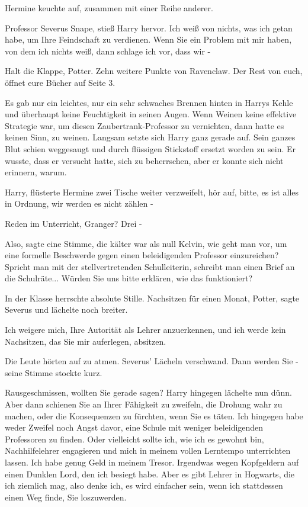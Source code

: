 Hermine keuchte auf, zusammen mit einer Reihe anderer.

\glqq Professor Severus Snape\grqq{}, stieß Harry hervor. \glqq Ich weiß von
nichts, was ich getan habe, um Ihre Feindschaft zu verdienen. Wenn Sie ein
Problem mit mir haben, von dem ich nichts weiß, dann schlage ich vor, dass wir
-\grqq{}

\glqq Halt die Klappe, Potter. Zehn weitere Punkte von Ravenclaw. Der Rest von
euch, öffnet eure Bücher auf Seite 3.\grqq{}

Es gab nur ein leichtes, nur ein sehr schwaches Brennen hinten in Harrys Kehle
und überhaupt keine Feuchtigkeit in seinen Augen. Wenn Weinen keine effektive
Strategie war, um diesen Zaubertrank-Professor zu vernichten, dann hatte es
keinen Sinn, zu weinen. Langsam setzte sich Harry ganz gerade auf. Sein ganzes
Blut schien weggesaugt und durch flüssigen Stickstoff ersetzt worden zu sein. Er
wusste, dass er versucht hatte, sich zu beherrschen, aber er konnte sich nicht
erinnern, warum.

\glqq Harry\grqq{}, flüsterte Hermine zwei Tische weiter verzweifelt, \glqq hör
auf, bitte, es ist alles in Ordnung, wir werden es nicht zählen -\grqq{}

\glqq Reden im Unterricht, Granger? Drei -\grqq{}

\glqq Also\grqq{}, sagte eine Stimme, die kälter war als null Kelvin, \glqq wie
geht man vor, um eine formelle Beschwerde gegen einen beleidigenden Professor
einzureichen? Spricht man mit der stellvertretenden Schulleiterin, schreibt man
einen Brief an die Schulräte... Würden Sie uns bitte erklären, wie das
funktioniert?\grqq{}

In der Klasse herrschte absolute Stille. \glqq Nachsitzen für einen Monat,
Potter\grqq{}, sagte Severus und lächelte noch breiter.

\glqq Ich weigere mich, Ihre Autorität als Lehrer anzuerkennen, und ich werde
kein Nachsitzen, das Sie mir auferlegen, absitzen.\grqq{}

Die Leute hörten auf zu atmen. Severus' Lächeln verschwand. \glqq Dann werden
Sie -\grqq{} seine Stimme stockte kurz.

\glqq Rausgeschmissen, wollten Sie gerade sagen?\grqq{} Harry hingegen lächelte
nun dünn. \glqq Aber dann schienen Sie an Ihrer Fähigkeit zu zweifeln, die
Drohung wahr zu machen, oder die Konsequenzen zu fürchten, wenn Sie es täten.
Ich hingegen habe weder Zweifel noch Angst davor, eine Schule mit weniger
beleidigenden Professoren zu finden. Oder vielleicht sollte ich, wie ich es
gewohnt bin, Nachhilfelehrer engagieren und mich in meinem vollen Lerntempo
unterrichten lassen. Ich habe genug Geld in meinem Tresor. Irgendwas wegen
Kopfgeldern auf einen Dunklen Lord, den ich besiegt habe. Aber es gibt Lehrer in
Hogwarts, die ich ziemlich mag, also denke ich, es wird einfacher sein, wenn ich
stattdessen einen Weg finde, Sie loszuwerden.\grqq{}

